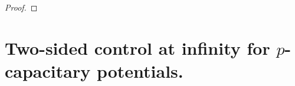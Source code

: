 \documentclass[10pt]{amsart}
\numberwithin{equation}{section}
\theoremstyle{definition}
\begin{document}
\begin{proof}



\end{proof}




\section{Two-sided control at infinity for $p$-capacitary potentials. }

\end{document}
